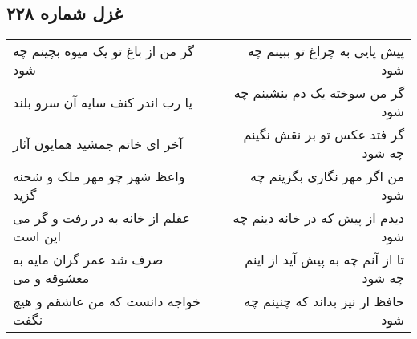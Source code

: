 \begin{center}
\section*{غزل شماره ۲۲۸}
\label{sec:sh228}
\begin{longtable}{l p{0.5cm} r}
گر من از باغ تو یک میوه بچینم چه شود
&&
پیش پایی به چراغ تو ببینم چه شود
\\
یا رب اندر کنف سایه آن سرو بلند
&&
گر من سوخته یک دم بنشینم چه شود
\\
آخر ای خاتم جمشید همایون آثار
&&
گر فتد عکس تو بر نقش نگینم چه شود
\\
واعظ شهر چو مهر ملک و شحنه گزید
&&
من اگر مهر نگاری بگزینم چه شود
\\
عقلم از خانه به در رفت و گر می این است
&&
دیدم از پیش که در خانه دینم چه شود
\\
صرف شد عمر گران مایه به معشوقه و می
&&
تا از آنم چه به پیش آید از اینم چه شود
\\
خواجه دانست که من عاشقم و هیچ نگفت
&&
حافظ ار نیز بداند که چنینم چه شود
\\
\end{longtable}
\end{center}
